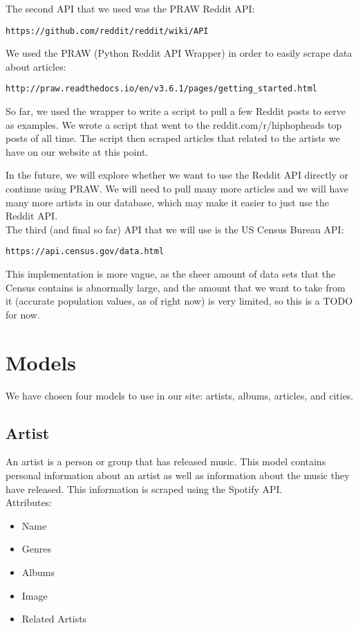 \documentclass{scrartcl}
\begin{document}
\noindent
The second API that we used was the PRAW Reddit API:
\begin{verbatim}https://github.com/reddit/reddit/wiki/API\end{verbatim}

\noindent
We used the PRAW (Python Reddit API Wrapper) in order to easily scrape data about articles:
\begin{verbatim}http://praw.readthedocs.io/en/v3.6.1/pages/getting_started.html\end{verbatim}

So far, we used the wrapper to write a script to pull a few Reddit posts to serve as examples. We wrote a script that went to the reddit.com/r/hiphopheads top posts of all time. The script then scraped articles that related to the artists we have on our website at this point.

In the future, we will explore whether we want to use the Reddit API directly or continue using PRAW. We will need to pull many more articles and we will have many more artists in our database, which may make it easier to just use the Reddit API.\\

\noindent
The third (and final so far) API that we will use is the US Census Bureau API:
\begin{verbatim}https://api.census.gov/data.html\end{verbatim}

This implementation is more vague, as the sheer amount of data sets that the Census contains is abnormally large, and the amount that we want to take from it (accurate population values, as of right now) is very limited, so this is a TODO for now.

\section{Models}
We have chosen four models to use in our site: artists, albums, articles, and cities.

\subsection{Artist}
An artist is a person or group that has released music. This model contains personal information about an artist as well as information about the music they have released. This information is scraped using the Spotify API.\\

Attributes:
\begin{itemize}
    \item Name
    \item Genres
    \item Albums
    \item Image
    \item Related Artists
\end{itemize}
\end{document}
